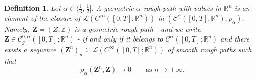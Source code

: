 \documentclass[11pt,a4paper]{article}
\newcommand{\R}{\mathbb{R}}
\newtheorem{defn}{Definition}[section]
\theoremstyle{plain}
\begin{document}

\begin{defn} \label{def:geometricroughpaths}
Let $\alpha \in (\frac13,\frac12]$. A geometric $\alpha$-rough path with values in $\R^n$ is an element of the closure of $\mathscr{L}({C}^\infty([0,T];\R^n))$ in $(\mathscr{C}^\alpha([0,T];\R^n),\rho_\alpha)$. Namely, $\mathbf{Z}=(Z,\mathbb{Z})$ is a geometric rough path - and we write $\mathbf{Z} \in \mathscr{C}^{0,\alpha}_g([0,T];\R^n) $ - if and only if it belongs to $\mathscr{C}^\alpha([0,T];\R^n)$ and there exists a sequence $(\mathbf{Z}^n)_n \subseteq  \mathscr{L}({C}^\infty([0,T];\R^n))$ of smooth rough paths such that \begin{equation*}
    \rho_\alpha(\mathbf{Z}^n,\mathbf{Z}) \to 0 \qquad \text{as $n \to +\infty$.}
\end{equation*}     
\end{defn}
\end{document}
